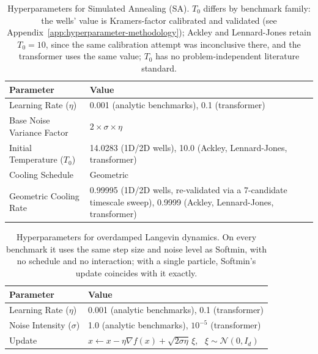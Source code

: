 \documentclass{article} %
\theoremstyle{plain}
\theoremstyle{definition}
\theoremstyle{remark}
\begin{document}
\begin{table}[!htbp]
\centering
\caption{Hyperparameters for Simulated Annealing (SA). $T_0$ differs by benchmark family: the wells' value is Kramers-factor calibrated and validated (see Appendix~\ref{app:hyperparameter-methodology}); Ackley and Lennard-Jones retain $T_0=10$, since the same calibration attempt was inconclusive there, and the transformer uses the same value; $T_0$ has no problem-independent literature standard.}
\label{tab:sa_hyperparams}
\begin{tabular}{@{}lp{}@{}}
\toprule
\textbf{Parameter} & \textbf{Value} \\
\midrule
Learning Rate ($\eta$) & 0.001 (analytic benchmarks), 0.1 (transformer) \\
Base Noise Variance Factor & $2 \times \sigma \times \eta$ \\
Initial Temperature ($T_0$) & 14.0283 (1D/2D wells), 10.0 (Ackley, Lennard-Jones, transformer) \\
Cooling Schedule & Geometric \\
Geometric Cooling Rate & 0.99995 (1D/2D wells, re-validated via a 7-candidate timescale sweep), 0.9999 (Ackley, Lennard-Jones, transformer) \\
\bottomrule
\end{tabular}
\end{table}

\begin{table}[!htbp]
\centering
\caption{Hyperparameters for overdamped Langevin dynamics. On every benchmark it uses the same step
size and noise level as Softmin, with no schedule and no interaction; with a single particle,
Softmin's update coincides with it exactly.}
\label{tab:langevin_hyperparams}
\begin{tabular}{@{}ll@{}}
\toprule
\textbf{Parameter} & \textbf{Value} \\
\midrule
Learning Rate ($\eta$) & 0.001 (analytic benchmarks), 0.1 (transformer) \\
Noise Intensity ($\sigma$) & 1.0 (analytic benchmarks), $10^{-5}$ (transformer) \\
Update & $x\gets x-\eta\nabla f(x)+\sqrt{2\sigma\eta}\,\xi$, \ $\xi\sim\mathcal{N}(0,I_d)$ \\
\bottomrule
\end{tabular}
\end{table}
\end{document}
